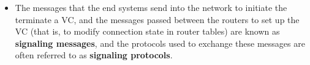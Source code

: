 \begin{itemize}
\item
The messages that the end systems send into the network to initiate the terminate a VC, and the messages passed between the routers to set up the VC (that is, to modify connection state in router tables) are known as \textbf{signaling messages}, and the protocols used to exchange these messages are often referred to as \textbf{signaling protocols}.














































\end{itemize}